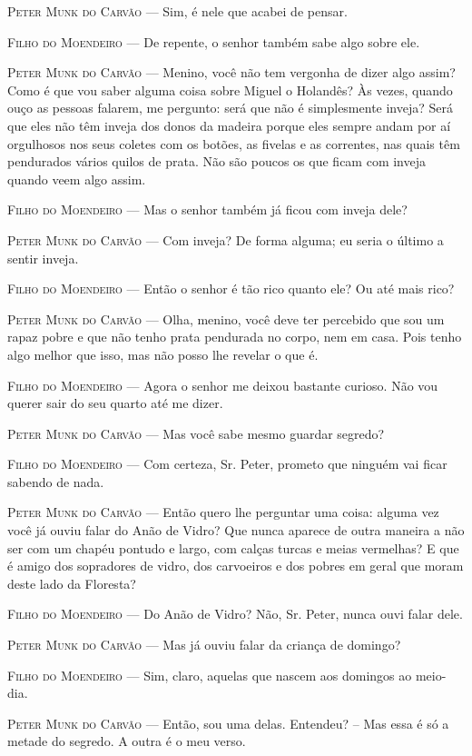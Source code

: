 \begin{myparindent}{0pt}
\begin{Parskip}
\textsc{Peter Munk do Carvão} --- Sim, é nele que acabei de pensar.

\textsc{Filho do Moendeiro} --- De repente, o senhor também sabe algo sobre ele.

\textsc{Peter Munk do Carvão} --- Menino, você não tem vergonha de dizer algo
assim? Como é que vou saber alguma coisa sobre Miguel o Holandês? Às
vezes, quando ouço as pessoas falarem, me pergunto: será que não é
simplesmente inveja? Será que eles não têm inveja dos donos da madeira
porque eles sempre andam por aí orgulhosos nos seus coletes com os
botões, as fivelas e as correntes, nas quais têm pendurados vários
quilos de prata. Não são poucos os que ficam com inveja quando veem algo
assim.

\textsc{Filho do Moendeiro} --- Mas o senhor também já ficou com inveja dele?

\textsc{Peter Munk do Carvão} --- Com inveja? De forma alguma; eu seria o último a
sentir inveja.

\textsc{Filho do Moendeiro} --- Então o senhor é tão rico quanto ele? Ou até mais
rico?

\textsc{Peter Munk do Carvão} --- Olha, menino, você deve ter percebido que sou um
rapaz pobre e que não tenho prata pendurada no corpo, nem em casa. Pois
tenho algo melhor que isso, mas não posso lhe revelar o que é.

\textsc{Filho do Moendeiro} --- Agora o senhor me deixou bastante curioso. Não vou
querer sair do seu quarto até me dizer.

\textsc{Peter Munk do Carvão} --- Mas você sabe mesmo guardar segredo?

\textsc{Filho do Moendeiro} --- Com certeza, Sr. Peter, prometo que ninguém vai
ficar sabendo de nada.

\textsc{Peter Munk do Carvão} --- Então quero lhe perguntar uma coisa: alguma vez
você já ouviu falar do Anão de Vidro? Que nunca aparece de outra maneira
a não ser com um chapéu pontudo e largo, com calças turcas e meias
vermelhas? E que é amigo dos sopradores de vidro, dos carvoeiros e dos
pobres em geral que moram deste lado da Floresta?

\textsc{Filho do Moendeiro} --- Do Anão de Vidro? Não, Sr. Peter, nunca ouvi falar
dele.

\textsc{Peter Munk do Carvão} --- Mas já ouviu falar da criança de domingo?

\textsc{Filho do Moendeiro} --- Sim, claro, aquelas que nascem aos domingos ao
meio-dia.

\textsc{Peter Munk do Carvão} --- Então, sou uma delas. Entendeu? -- Mas essa é só
a metade do segredo. A outra é o meu verso.


\end{Parskip}
\end{myparindent}
